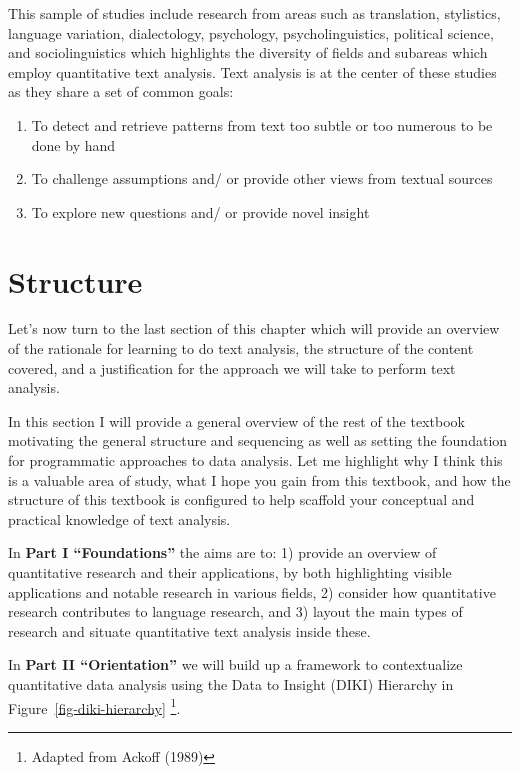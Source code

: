 \documentclass[
  letterpaper,
]{latex/krantz}
\providecommand{\tightlist}{%
  \setlength{\itemsep}{0pt}\setlength{\parskip}{0pt}}\usepackage{longtable,booktabs,array}
\begin{document}
This sample of studies include research from areas such as translation,
stylistics, language variation, dialectology, psychology,
psycholinguistics, political science, and sociolinguistics which
highlights the diversity of fields and subareas which employ
quantitative text analysis. Text analysis is at the center of these
studies as they share a set of common goals:

\begin{enumerate}
\def\labelenumi{\arabic{enumi}.}
\tightlist
\item
  To detect and retrieve patterns from text too subtle or too numerous
  to be done by hand
\item
  To challenge assumptions and/ or provide other views from textual
  sources
\item
  To explore new questions and/ or provide novel insight
\end{enumerate}

\hypertarget{structure}{%
\section{Structure}\label{structure}}

Let's now turn to the last section of this chapter which will provide an
overview of the rationale for learning to do text analysis, the
structure of the content covered, and a justification for the approach
we will take to perform text analysis.

In this section I will provide a general overview of the rest of the
textbook motivating the general structure and sequencing as well as
setting the foundation for programmatic approaches to data analysis. Let
me highlight why I think this is a valuable area of study, what I hope
you gain from this textbook, and how the structure of this textbook is
configured to help scaffold your conceptual and practical knowledge of
text analysis.

In \textbf{Part I ``Foundations''} the aims are to: 1) provide an
overview of quantitative research and their applications, by both
highlighting visible applications and notable research in various
fields, 2) consider how quantitative research contributes to language
research, and 3) layout the main types of research and situate
quantitative text analysis inside these.

In \textbf{Part II ``Orientation''} we will build up a framework to
contextualize quantitative data analysis using the Data to Insight
(DIKI) Hierarchy in Figure~\ref{fig-diki-hierarchy} \footnote{Adapted
  from Ackoff (1989)}.
\end{document}
